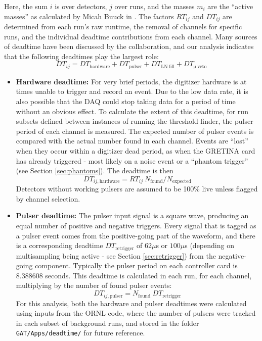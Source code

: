 \documentclass[notitlepage,rmp,aps,10pt]{revtex4-1}
\begin{document}
Here, the sum $i$ is over detectors, $j$ over runs, and the masses $m_i$ are the ``active masses'' as calculated by Micah Buuck in \cite{Buuck2016}.
The factors $RT_{ij}$ and $DT_{ij}$ are determined from each run's raw runtime, the removal of channels for specific runs, and the individual deadtime contributions from each channel.  Many sources of deadtime have been discussed by the collaboration, and our analysis indicates that the following deadtimes play the largest role:
\begin{equation}
  DT_{ij} = DT_{\mathrm{hardware}} + DT_{\mathrm{pulser}} + DT_{\mathrm{LN\ fill}} + DT_{\mathrm{\mu\ veto}}
\end{equation}
\begin{itemize}
    \item \textbf{Hardware deadtime:} For very brief periods, the digitizer hardware is at times unable to trigger and record an event. Due to the low data rate, it is also possible that the DAQ could stop taking data for a period of time without an obvious effect. To calculate the extent of this deadtime, for run subsets defined between instances of running the threshold finder, the pulser period of each channel is measured. The expected number of pulser events is compared with the actual number found in each channel.  Events are ``lost'' when they occur within a digitizer dead period, as when the GRETINA card has already triggered - most likely on a noise event or a ``phantom trigger'' (see Section \ref{sec:phantoms}).  The deadtime is then
    \begin{equation}
      DT_{ij,\mathrm{hardware}} = RT_{ij}\ N_{\mathrm{found}} / N_{\mathrm{expected}}
    \end{equation}
    Detectors without working pulsers are assumed to be 100\% live unless flagged by channel selection.

    \item \textbf{Pulser deadtime:} The pulser input signal is a square wave, producing an equal number of positive and negative triggers. Every signal that is tagged as a pulser event comes from the positive-going part of the waveform, and there is a corresponding deadtime $DT_{\mathrm{retrigger}}$ of $62\mu$s or $100\mu$s (depending on multisampling being active - see Section \ref{sec:retrigger}) from the negative-going component.  Typically the pulser period on each controller card is 8.388608 seconds.  This deadtime is calculated in each run, for each channel, multiplying by the number of found pulser events:
    \begin{equation}
      DT_{ij,\mathrm{pulser}} = N_{\mathrm{found}}\ DT_{\mathrm{retrigger}}
    \end{equation}
    For this analysis, both the hardware and pulser deadtimes were calculated using inputs from the ORNL code, where the number of pulsers were tracked in each subset of background runs, and stored in the folder \texttt{GAT/Apps/deadtime/} for future reference.


\end{itemize}
\end{document}
